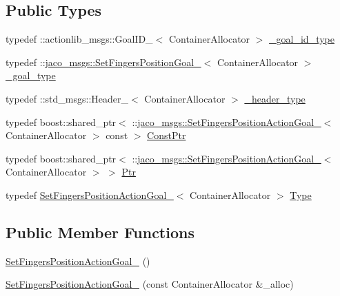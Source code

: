 \subsection*{Public Types}
\begin{DoxyCompactItemize}
\item 
typedef \+::actionlib\+\_\+msgs\+::\+Goal\+I\+D\+\_\+$<$ Container\+Allocator $>$ \hyperlink{structjaco__msgs_1_1SetFingersPositionActionGoal___abbed6c9e246b67002f6688488b9194cf}{\+\_\+goal\+\_\+id\+\_\+type}
\item 
typedef \+::\hyperlink{structjaco__msgs_1_1SetFingersPositionGoal__}{jaco\+\_\+msgs\+::\+Set\+Fingers\+Position\+Goal\+\_\+}$<$ Container\+Allocator $>$ \hyperlink{structjaco__msgs_1_1SetFingersPositionActionGoal___a6221e777345b9fb8eba1888205ac5c25}{\+\_\+goal\+\_\+type}
\item 
typedef \+::std\+\_\+msgs\+::\+Header\+\_\+$<$ Container\+Allocator $>$ \hyperlink{structjaco__msgs_1_1SetFingersPositionActionGoal___aeee4ff5a362ba3a4fcf0f858f5c9ec85}{\+\_\+header\+\_\+type}
\item 
typedef boost\+::shared\+\_\+ptr$<$ \+::\hyperlink{structjaco__msgs_1_1SetFingersPositionActionGoal__}{jaco\+\_\+msgs\+::\+Set\+Fingers\+Position\+Action\+Goal\+\_\+}$<$ Container\+Allocator $>$ const  $>$ \hyperlink{structjaco__msgs_1_1SetFingersPositionActionGoal___abb5a10773a57af138b5251d407eb20e8}{Const\+Ptr}
\item 
typedef boost\+::shared\+\_\+ptr$<$ \+::\hyperlink{structjaco__msgs_1_1SetFingersPositionActionGoal__}{jaco\+\_\+msgs\+::\+Set\+Fingers\+Position\+Action\+Goal\+\_\+}$<$ Container\+Allocator $>$ $>$ \hyperlink{structjaco__msgs_1_1SetFingersPositionActionGoal___af0a8d08cc877743c177a1f773efbdbe0}{Ptr}
\item 
typedef \hyperlink{structjaco__msgs_1_1SetFingersPositionActionGoal__}{Set\+Fingers\+Position\+Action\+Goal\+\_\+}$<$ Container\+Allocator $>$ \hyperlink{structjaco__msgs_1_1SetFingersPositionActionGoal___a39246407a8fc4cc43c8714a7e2b44d06}{Type}
\end{DoxyCompactItemize}
\subsection*{Public Member Functions}
\begin{DoxyCompactItemize}
\item 
\hyperlink{structjaco__msgs_1_1SetFingersPositionActionGoal___ae7caed8855bda70fa6575e1f12d0cff2}{Set\+Fingers\+Position\+Action\+Goal\+\_\+} ()
\item 
\hyperlink{structjaco__msgs_1_1SetFingersPositionActionGoal___ac45545f09b7651d89d406c25eccf99f0}{Set\+Fingers\+Position\+Action\+Goal\+\_\+} (const Container\+Allocator \&\+\_\+alloc)
\end{DoxyCompactItemize}

